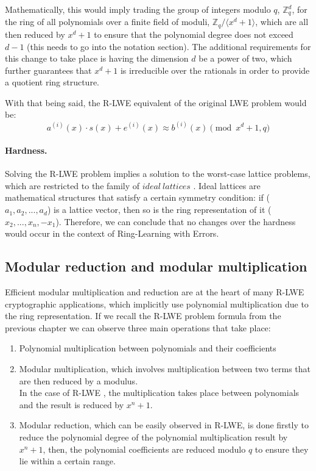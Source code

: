 \documentclass[11pt,
  titlepage=false,
  abstract=on,
]{scrreprt}
\begin{document}
Mathematically, this would imply trading the group of integers modulo $q$, $\mathbb{Z}^d_q$, for the ring of all polynomials over a finite field of moduli, $\mathbb{Z}_q / \langle x^d + 1\rangle$, which are all then reduced by $x^d + 1$
to ensure that the polynomial degree does not exceed $d-1$ (this needs to go into the notation section).
The additional requirements for this change  to take place is having the dimension $d$ be a power of two, which further guarantees that $x^d + 1$ is irreducible over the rationals in order to provide
a quotient ring structure.

With that being said, the R-LWE equivalent of the original LWE problem would be:
\begin{equation*}
  a^{(i)}(x) \cdot s(x) + e^{(i)}(x) \approx b^{(i)}(x) \pmod{x^d + 1, q}
  \label{The Ring-Learning with Errors Problem}
\end{equation*}


\paragraph{Hardness.} Solving the R-LWE problem implies a solution to the worst-case lattice problems, which are restricted to the family of $ideal\ lattices$ \cite{lyubashevsky2010ideal}. Ideal lattices are mathematical
structures that satisfy a certain symmetry condition: if ($a_1, a_2,..., a_d$) is a lattice vector, then so is the ring representation of it ($x_2,...,x_n, -x_1$).
Therefore, we can conclude that no changes over the hardness would occur in the context of Ring-Learning with Errors.
\subsection{Modular reduction and modular multiplication}
Efficient modular multiplication and reduction are at the heart of many R-LWE cryptographic applications, which implicitly use polynomial multiplication due to the ring representation.
If we recall the R-LWE problem formula from the previous chapter
we can observe three main operations that take place:
\begin{enumerate}
  \item Polynomial multiplication between polynomials and their coefficients
  \item Modular multiplication, which involves multiplication between two terms that are then reduced by a modulus.\\
        In the case of R-LWE , the multiplication takes place between polynomials and the result is reduced by $x^n + 1$.
  \item Modular reduction, which can be easily observed in R-LWE, is done firstly to reduce the polynomial degree of the polynomial multiplication result by $x^n + 1$,
  then, the polynomial coefficients are reduced modulo $q$ to ensure they lie within a certain range.
\end{enumerate}
\end{document}
